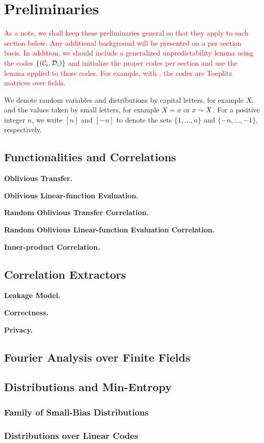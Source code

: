 \section{Preliminaries}
\textcolor{red}{As a note, we shall keep these preliminaries general so that they apply to each section below. Any additional background will be presented on a per section basis.
In addition, we should include a generalized unpredictability lemma using the codes $\{({\mathcal C}_i, {\mathcal D}_i)\}$ and initialize the proper codes per section and use the lemma applied to those codes.
For example, with \cite{C:BloMajNgu17}, the codes are Toeplitz matrices over fields.}

We denote random variables and distributions by capital letters, for example $X$, and the values taken by small letters, for example $X = x$ or $x \sim X$.
For a positive integer $n$, we write $[n]$ and $[-n]$ to denote the sets $\{ 1,\dotsc, n \}$ and $\{ -n,\dotsc, -1 \}$, respectively.

\subsection{Functionalities and Correlations}

\textbf{Oblivious Transfer.}

\textbf{Oblivious Linear-function Evaluation.}

\textbf{Random Oblivious Transfer Correlation.}

\textbf{Random Oblivious Linear-function Evaluation Correlation.}

\textbf{Inner-product Correlation.}


\subsection{Correlation Extractors}

\textbf{Leakage Model.}

\textbf{Correctness.}

\textbf{Privacy.}

\subsection{Fourier Analysis over Finite Fields}

\subsection{Distributions and Min-Entropy}

\subsubsection{Family of Small-Bias Distributions}

\subsubsection{Distributions over Linear Codes}